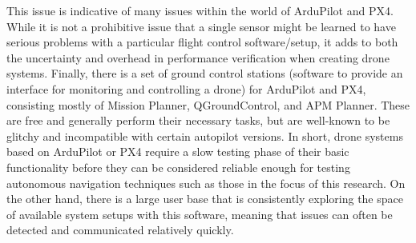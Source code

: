 This issue is indicative of many issues within the world of ArduPilot and PX4.
While it is not a prohibitive issue that a single sensor might be learned to have serious problems with a particular flight control software/setup,
it adds to both the uncertainty and overhead in performance verification when creating drone systems.
Finally, there is a set of ground control stations (software to provide an interface for monitoring and controlling a drone)
for ArduPilot and PX4, consisting mostly of Mission Planner, QGroundControl, and APM Planner.
These are free and generally perform their necessary tasks, but are well-known to be glitchy
and incompatible with certain autopilot versions.
In short, drone systems based on ArduPilot or PX4 require a slow testing phase of their basic functionality
before they can be considered reliable enough for testing autonomous navigation techniques such as those in the focus of this research.
On the other hand, there is a large user base that is consistently exploring the space of available system setups with this software,
meaning that issues can often be detected and communicated relatively quickly.

